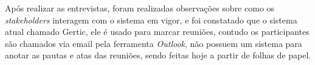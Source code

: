 Após realizar as entrevistas, foram realizadas observações sobre como os \textit{stakeholders} interagem com o sistema em vigor, e foi constatado que o sistema atual chamado Gertic, ele é usado para marcar reuniões, contudo os participantes são chamados via email pela ferramenta \textit{Outlook}, não possuem um sistema para anotar as pautas e atas das reuniões, sendo feitas hoje a partir de folhas de papel.












